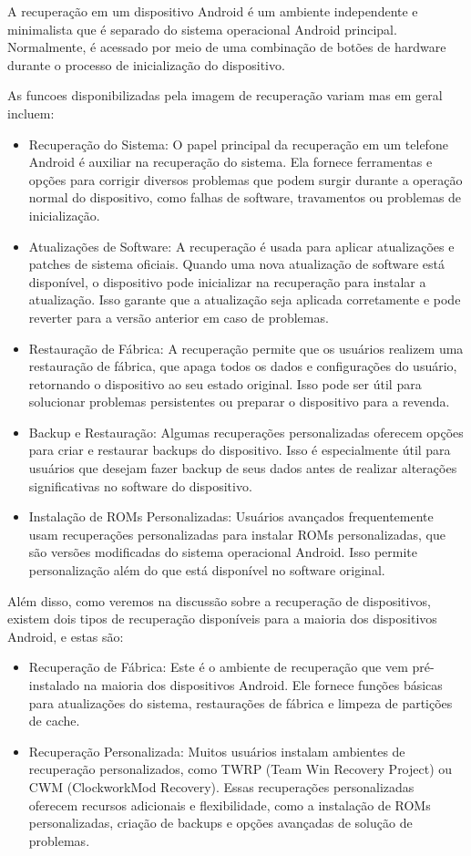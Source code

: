 A recuperação em um dispositivo Android é um ambiente independente e minimalista que é separado do sistema operacional Android principal. Normalmente, é acessado por meio de uma combinação de botões de hardware durante o processo de inicialização do dispositivo.

As funcoes disponibilizadas pela imagem de recuperação variam mas em geral incluem:

\begin{itemize}
    \item Recuperação do Sistema: O papel principal da recuperação em um telefone Android é auxiliar na recuperação do sistema. Ela fornece ferramentas e opções para corrigir diversos problemas que podem surgir durante a operação normal do dispositivo, como falhas de software, travamentos ou problemas de inicialização.
    \item Atualizações de Software: A recuperação é usada para aplicar atualizações e patches de sistema oficiais. Quando uma nova atualização de software está disponível, o dispositivo pode inicializar na recuperação para instalar a atualização. Isso garante que a atualização seja aplicada corretamente e pode reverter para a versão anterior em caso de problemas.
    \item Restauração de Fábrica: A recuperação permite que os usuários realizem uma restauração de fábrica, que apaga todos os dados e configurações do usuário, retornando o dispositivo ao seu estado original. Isso pode ser útil para solucionar problemas persistentes ou preparar o dispositivo para a revenda.
    \item Backup e Restauração: Algumas recuperações personalizadas oferecem opções para criar e restaurar backups do dispositivo. Isso é especialmente útil para usuários que desejam fazer backup de seus dados antes de realizar alterações significativas no software do dispositivo.
    \item Instalação de ROMs Personalizadas: Usuários avançados frequentemente usam recuperações personalizadas para instalar ROMs personalizadas, que são versões modificadas do sistema operacional Android. Isso permite personalização além do que está disponível no software original.
\end{itemize}

Além disso, como veremos na discussão sobre a recuperação de dispositivos, existem dois tipos de recuperação disponíveis para a maioria dos dispositivos Android, e estas são:

\begin{itemize}
    \item Recuperação de Fábrica: Este é o ambiente de recuperação que vem pré-instalado na maioria dos dispositivos Android. Ele fornece funções básicas para atualizações do sistema, restaurações de fábrica e limpeza de partições de cache.
    \item Recuperação Personalizada: Muitos usuários instalam ambientes de recuperação personalizados, como TWRP (Team Win Recovery Project) ou CWM (ClockworkMod Recovery). Essas recuperações personalizadas oferecem recursos adicionais e flexibilidade, como a instalação de ROMs personalizadas, criação de backups e opções avançadas de solução de problemas.
\end{itemize}


